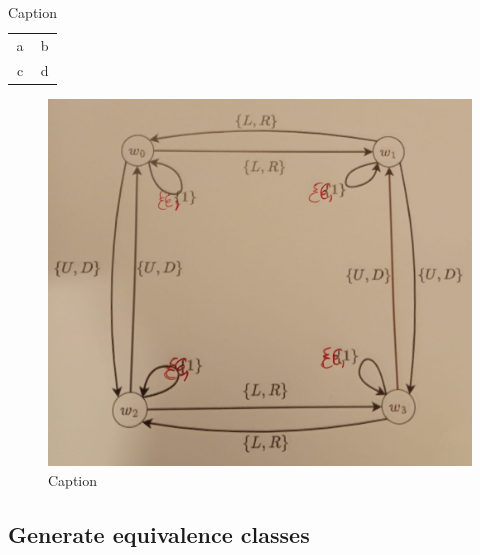 \begin{table}[H]
    \centering
    \begin{tabular}{c|c}
        a & b \\
        c & d
    \end{tabular}
    \caption{Caption}
    \label{tab:my_label}
\end{table}


\begin{figure}[H]
    \centering
    \includegraphics[width=0.5\linewidth]{2MathematicalFramework/InitialFramework/Images/2x2_cyclical_equivalence_min_actions.jpeg}
    \caption{Caption}
    \label{fig:enter-label}
\end{figure}


\subsection{Generate equivalence classes}

